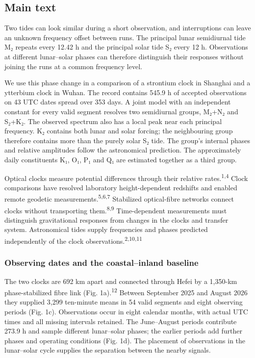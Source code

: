 \documentclass[
  10pt,
  a4paper,
]{article}
\begin{document}
\hypertarget{main-text}{%
\subsection{Main text}\label{main-text}}

Two tides can look similar during a short observation, and interruptions
can leave an unknown frequency offset between runs. The principal lunar
semidiurnal tide M₂ repeats every 12.42 h and the principal solar tide
S₂ every 12 h. Observations at different lunar--solar phases can
therefore distinguish their responses without joining the runs at a
common frequency level.

We use this phase change in a comparison of a strontium clock in
Shanghai and a ytterbium clock in Wuhan. The record contains 545.9 h of
accepted observations on 43 UTC dates spread over 353 days. A joint
model with an independent constant for every valid segment resolves two
semidiurnal groups, M₂+N₂ and S₂+K₂. The observed spectrum also has a
local peak near each principal frequency. K₂ contains both lunar and
solar forcing; the neighbouring group therefore contains more than the
purely solar S₂ tide. The group's internal phases and relative
amplitudes follow the astronomical prediction. The approximately daily
constituents K₁, O₁, P₁ and Q₁ are estimated together as a third group.

Optical clocks measure potential differences through their relative
rates.\textsuperscript{1,4} Clock comparisons have resolved laboratory
height-dependent redshifts and enabled remote geodetic
measurements.\textsuperscript{5,6,7} Stabilized optical-fibre networks
connect clocks without transporting them.\textsuperscript{8,9}
Time-dependent measurements must distinguish gravitational responses
from changes in the clocks and transfer system. Astronomical tides
supply frequencies and phases predicted independently of the clock
observations.\textsuperscript{2,10,11}

\hypertarget{observing-dates-and-the-coastalinland-baseline}{%
\subsubsection{Observing dates and the coastal--inland
baseline}\label{observing-dates-and-the-coastalinland-baseline}}

The two clocks are 692 km apart and connected through Hefei by a
1,350-km phase-stabilized fibre link (Fig. 1a).\textsuperscript{12}
Between September 2025 and August 2026 they supplied 3,299 ten-minute
means in 54 valid segments and eight observing periods (Fig. 1c).
Observations occur in eight calendar months, with actual UTC times and
all missing intervals retained. The June--August periods contribute
273.9 h and sample different lunar--solar phases; the earlier periods
add further phases and operating conditions (Fig. 1d). The placement of
observations in the lunar--solar cycle supplies the separation between
the nearby signals.
\end{document}
